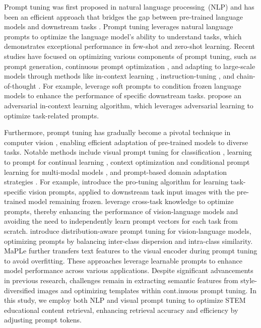 Prompt tuning \cite{brown2020language} was first proposed in natural language processing~(NLP) and has been an efficient approach that bridges the gap between pre-trained language models and downstream tasks \cite{li2023weakly}. Prompt tuning leverages natural language prompts to optimize the language model’s ability to understand tasks, which demonstrates exceptional performance in few-shot and zero-shot learning. 
Recent studies have focused on optimizing various components of prompt tuning, such as  prompt generation, continuous prompt optimization \cite{prompt3}, and adapting to large-scale models through methods like in-context learning \cite{dong2024survey}, instruction-tuning \cite{wang2024pandalm}, and chain-of-thought \cite{prompt4}. For example, \citet{lester2021power} leverage soft prompts to condition frozen language models to enhance the performance of specific downstream tasks. \citet{long2024prompt} propose an adversarial in-context learning algorithm, which leverages adversarial learning to optimize task-related prompts.

Furthermore, prompt tuning has gradually become a pivotal technique in computer vision \cite{shen2024multitask}, enabling efficient adaptation of pre-trained models to diverse tasks. Notable methods include visual prompt tuning for classification \cite{jia2022visual}, learning to prompt for continual learning \cite{wang2022learning}, context optimization and conditional prompt learning for multi-modal models \cite{zhou2022conditional}, and prompt-based domain adaptation strategies \cite{ge2023domain}.
For example, \citet{nie2023pro} introduce the pro-tuning algorithm for learning task-specific vision prompts, applied to downstream task input images with the pre-trained model remaining frozen.
\citet{shen2024multitask} leverage cross-task knowledge to optimize prompts, thereby enhancing the performance of vision-language models and avoiding the need to independently learn prompt vectors for each task from scratch.
\citet{cho2023distribution} introduce distribution-aware prompt tuning for vision-language models, optimizing prompts by balancing inter-class dispersion and intra-class similarity.
MaPLe \cite{khattak2023maple} further transfers text features to the visual encoder during prompt tuning to avoid overfitting. These approaches leverage learnable prompts to enhance model performance across various applications. Despite significant advancements in previous research, challenges remain in extracting semantic features from style-diversified images and optimizing templates within cont.inuous prompt tuning. 
In this study, we employ both NLP and visual prompt tuning to optimize STEM educational content retrieval, enhancing retrieval accuracy and efficiency by adjusting prompt tokens.

